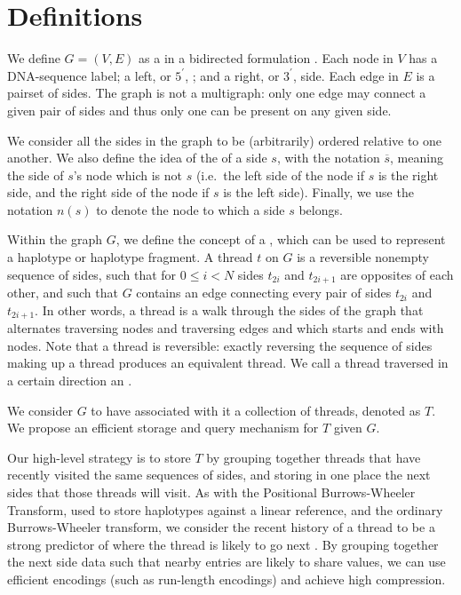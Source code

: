 \section{Definitions}

We define $G = (V, E)$ as a  in a bidirected formulation \cite{medvedev2009maximum, paten2014mapping}. Each node in $V$ has a DNA-sequence label; a left, or $5^\prime$, ; and a right, or $3^\prime$, side. Each edge in $E$ is a pairset of sides. The graph is not a multigraph: only one edge may connect a given pair of sides and thus only one  can be present on any given side.

We consider all the sides in the graph to be (arbitrarily) ordered relative to one another. We also define the idea of the  of a side $s$, with the notation $\overline{s}$, meaning the side of $s$'s node which is not $s$ (i.e.\ the left side of the node if $s$ is the right side, and the right side of the node if $s$ is the left side). Finally, we use the notation $n(s)$ to denote the node to which a side $s$ belongs.

Within the graph $G$, we define the concept of a , which can be used to represent a haplotype or haplotype fragment. A thread $t$ on $G$ is a reversible nonempty sequence of sides, such that for $0 \leq i < N$ sides $t_{2i}$ and $t_{2i+1}$ are opposites of each other, and such that $G$ contains an edge connecting every pair of sides $t_{2i}$ and $t_{2i+1}$. In other words, a thread is a walk through the sides of the graph that alternates traversing nodes and traversing edges and which starts and ends with nodes. Note that a thread is reversible: exactly reversing the sequence of sides making up a thread produces an equivalent thread. We call a thread traversed in a certain direction an . 

We consider $G$ to have associated with it a collection of  threads, denoted as $T$. We propose an efficient storage and query mechanism for $T$ given $G$.

Our high-level strategy is to store $T$ by grouping together threads that have recently visited the same sequences of sides, and storing in one place the next sides that those threads will visit. As with the Positional Burrows-Wheeler Transform, used to store haplotypes against a linear reference, and the ordinary Burrows-Wheeler transform, we consider the recent history of a thread to be a strong predictor of where the thread is likely to go next \cite{durbin2014efficient}. By grouping together the next side data such that nearby entries are likely to share values, we can use efficient encodings (such as run-length encodings) and achieve high compression.

